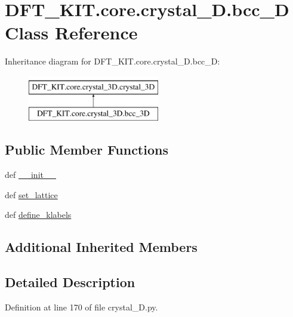 \hypertarget{class_d_f_t___k_i_t_1_1core_1_1crystal__3_d_1_1bcc__3_d}{\section{D\+F\+T\+\_\+\+K\+I\+T.\+core.\+crystal\+\_\+D.\+bcc\+\_\+D Class Reference}
\label{class_d_f_t___k_i_t_1_1core_1_1crystal__3_d_1_1bcc__3_d}
}
Inheritance diagram for D\+F\+T\+\_\+\+K\+I\+T.\+core.\+crystal\+\_\+D.\+bcc\+\_\+D\+:\begin{figure}[H]
\begin{center}
\leavevmode
\includegraphics[height=2.000000cm]{class_d_f_t___k_i_t_1_1core_1_1crystal__3_d_1_1bcc__3_d}
\end{center}
\end{figure}
\subsection*{Public Member Functions}
\begin{DoxyCompactItemize}
\item 
def \hyperlink{class_d_f_t___k_i_t_1_1core_1_1crystal__3_d_1_1bcc__3_d_a909776a325e8a2391f658c4dbed6d14f}{\+\_\+\+\_\+init\+\_\+\+\_\+}
\item 
def \hyperlink{class_d_f_t___k_i_t_1_1core_1_1crystal__3_d_1_1bcc__3_d_aeb82880d1d70d1be856ceb6926c191cb}{set\+\_\+lattice}
\item 
def \hyperlink{class_d_f_t___k_i_t_1_1core_1_1crystal__3_d_1_1bcc__3_d_a37169d59118daa78f4f41aefd25a104d}{define\+\_\+klabels}
\end{DoxyCompactItemize}
\subsection*{Additional Inherited Members}


\subsection{Detailed Description}


Definition at line 170 of file crystal\+\_\+D.\+py.



